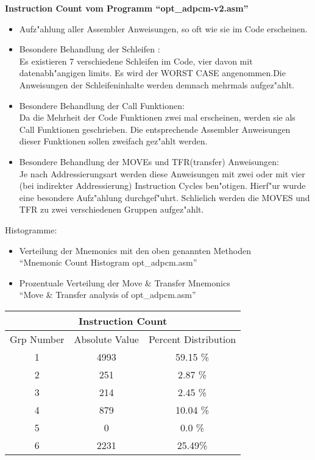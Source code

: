 
\centerline{\bf Instruction Count vom Programm ``opt\_adpcm-v2.asm''}

\begin{itemize}
\item Aufz"ahlung aller Assembler Anweisungen, so oft wie sie im Code erscheinen.
\item Besondere Behandlung der Schleifen :\\
Es existieren 7 verschiedene Schleifen im Code, vier davon 
mit datenabh"angigen limits. Es wird der WORST CASE angenommen.Die
Anweisungen der Schleifeninhalte werden demnach mehrmals aufgez"ahlt.
\item Besondere Behandlung der Call Funktionen:\\
Da die Mehrheit der Code Funktionen zwei mal erscheinen, werden
sie als Call Funktionen geschrieben. Die entsprechende Assembler
Anweisungen dieser Funktionen sollen zweifach gez"ahlt werden.
\item Besondere Behandlung der MOVEs und TFR(transfer) Anweisungen:\\
Je nach Addressierungsart werden diese Anweisungen mit zwei oder mit
vier (bei indirekter Addressierung) Instruction Cycles ben"otigen.
Hierf"ur wurde eine besondere Aufz"ahlung durchgef"uhrt. Schlie\3lich 
werden die MOVES und TFR zu zwei verschiedenen Gruppen aufgez"ahlt.
\end{itemize}

\vspace{1mm}

Histogramme: 

\begin{itemize}
\item Verteilung der Mnemonics mit den oben genannten Methoden \\
``Mnemonic Count Histogram opt\_adpcm.asm''

\item Prozentuale Verteilung der Move \& Transfer Mnemonics \\
``Move \& Transfer analysis of opt\_adpcm.asm''
\end{itemize}

\begin{table}
\begin{tabular}{|c|c|c|} \hline
\multicolumn{3}{|c|}{Instruction Count} \\ \hline
Grp Number & Absolute Value & Percent Distribution \\ 
1 & 4993 & 59.15 \%\\
2 & 251 & 2.87 \% \\
3 & 214 & 2.45 \% \\
4 & 879 & 10.04 \% \\
5 & 0 & 0.0 \% \\
6 & 2231 & 25.49\% \\ \hline
\end{tabular}
\end{table}

